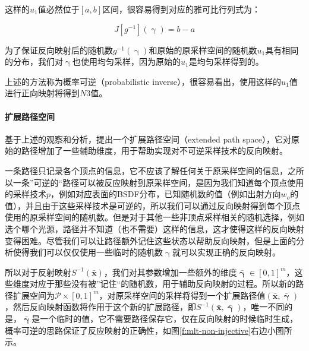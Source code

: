 \noindent 这样的$u_1$值必然位于$[a,b]$区间，很容易得到对应的雅可比行列式为：

\begin{equation}\label{e:mlt-intervals-2}
	J[g^{-1}](\upgamma)=b-a
\end{equation}

\noindent 为了保证反向映射后的随机数$g^{-1}(\upgamma)$和原始的原采样空间的随机数$u_1$具有相同的分布，我们对$\upgamma$也使用均匀采样，因为原始的$u_1$是均匀采样得到的。

上述的方法称为概率可逆（probabilistic inverse），很容易看出，使用这样的$u_1$值进行正向映射将得到$N3$值。




\paragraph{扩展路径空间}
基于上述的观察和分析，\cite{a:ReversibleJumpMetropolisLightTransportusingInverseMappings}提出一个扩展路径空间（extended path space），它对原始的路径增加了一些辅助维度，用于帮助实现对不可逆采样技术的反向映射。

一条路径只记录各个顶点的信息，它不应该了解任何关于原采样空间的信息，之所以一条”可逆的“路径可以被反应映射到原采样空间，是因为我们知道每个顶点使用的采样技术$p$，例如对应表面的BSDF分布，已知随机数的值（例如出射方向$w_o$的值），并且由于这些采样技术是可逆的，所以我们可以通过反向映射得到每个顶点使用的原采样空间的随机数。但是对于其他一些非顶点采样相关的随机选择，例如选个哪个光源，路径并不知道（也不需要）这样的信息，这才使得这样的反向映射变得困难。尽管我们可以让路径额外记住这些状态以帮助反向映射，但是上面的分析使得我们可以仅仅使用一些临时的随机数$\upgamma$就可以实现正确的反向映射。

所以对于反射映射$S^{-1}(\bar{\mathbf{x}})$，我们对其参数增加一些额外的维度$\bar{\mathbf{\upgamma}}\in[0,1]^{m}$，这些维度对应于那些没有被”记住“的随机数，用于辅助反向映射的过程。所以新的路径扩展空间为$\mathcal{P}\times[0,1]^{m}$，对原采样空间的采样将得到一个扩展路径值$(\bar{\mathbf{x}},\bar{\mathbf{\upgamma}})$，然后反向映射函数将作用于这个新的扩展路径，即$S^{-1}(\bar{\mathbf{x}},\bar{\mathbf{\upgamma}})$，唯一不同的是，$\bar{\mathbf{\upgamma}}$是一个临时的值，它不需要路径保存它，仅在反向映射的时候临时生成，概率可逆的思路保证了反应映射的正确性，如图\ref{f:mlt-non-injective}右边小图所示。

